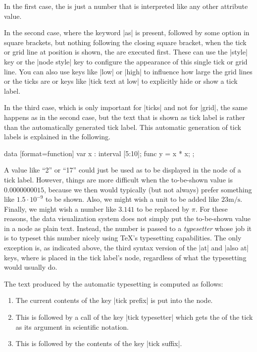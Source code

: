 In the first case, the  is just a number that is interpreted like any other attribute value.

In the second case, where the keyword |as| is present, followed by some option in square brackets, but nothing following the closing square bracket, when the tick or grid line at position  is shown, the  are executed first. These can use the |style| key or the |node style| key to configure the appearance of this single tick or grid line. You can also use keys like |low| or |high| to influence how large the grid lines or the ticks are or keys like |tick text at low| to explicitly hide or show a tick label.

In the third case, which is only important for |ticks| and not for |grid|, the same happens as in the second case, but the text that is shown as tick label is  rather than the automatically generated tick label. This automatic generation of tick labels is explained in the following.
%
\begin{codeexample}[preamble={\usetikzlibrary{datavisualization.formats.functions}}]
\tikz \datavisualization
  [scientific axes=clean,
   x axis={length=2.5cm, ticks={major at={
         5,
         6 as [style=red],
         7 as [{style=blue, low=-1em}],
         8 as [style=green] $2^3$,
         10 as ten
       }}},
   visualize as line]
  data [format=function] {
    var x : interval [5:10];
    func y = \value x * \value x;
  };
\end{codeexample}

A value like ``2'' or ``17'' could just be used as  to be displayed in the node of a tick label. However, things are more difficult when the to-be-shown value is $0.0000000015$, because we then would typically (but not always) prefer something like $1.5 \cdot 10^{-9}$ to be shown. Also, we might wish a unit to be added like $23\mathrm{m}/\mathrm{s}$. Finally, we might wish a number like $3.141$ to be replaced by $\pi$. For these reasons, the data visualization system does not simply put the to-be-shown value in a node as plain text. Instead, the number is passed to a \emph{typesetter} whose job it is to typeset this number nicely using \TeX's typesetting capabilities. The only exception is, as indicated above, the third syntax version of the |at| and |also at| keys, where  is placed in the tick label's node, regardless of what the typesetting would usually do.

The text produced by the automatic typesetting is computed as follows:
%
\begin{enumerate}
    \item The current contents of the key |tick prefix| is put into the node.
    \item This is followed by a call of the key |tick typesetter| which gets the  of the tick as its argument in scientific notation.
    \item This is followed by the contents of the key |tick suffix|.
\end{enumerate}

